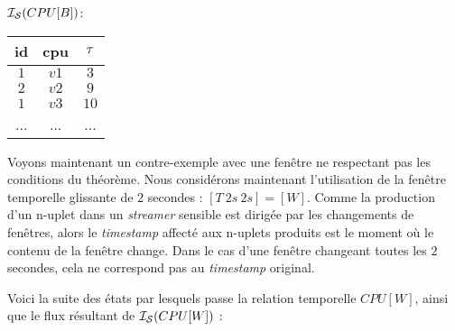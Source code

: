 \begin{example}
\begin{minipage}[c]{0.24\linewidth}
\begin{center}$\mathcal{I_S}(CPU[B])$: \\
\begin{tabular}{|c|c|c|}
\hline
id & cpu & $\tau$ \\ \hline
$1$ & $v1$ & $3$ \\ \hline
$2$ & $v2$ & $9$ \\ \hline
$1$ & $v3$ & $10$ \\ \hline
... & ... & ... \\ \hline
\end{tabular}\end{center}
\end{minipage} %

Voyons maintenant un contre-exemple avec une fenêtre ne respectant pas les conditions du théorème. Nous considérons maintenant l'utilisation de la fenêtre temporelle glissante de $2$ secondes : $[T\ 2s\ 2s]=[W]$. Comme la production d'un n-uplet dans un \textit{streamer} sensible est dirigée par les changements de fenêtres, alors le \textit{timestamp} affecté aux n-uplets produits est le moment où le contenu de la fenêtre change. Dans le cas d'une fenêtre changeant toutes les $2$ secondes, cela ne correspond pas au \textit{timestamp} original.

Voici la suite des états par lesquels passe la relation temporelle $CPU[W]$, ainsi que le flux résultant de $\mathcal{I_S}(CPU[W])$ :


\end{example}
